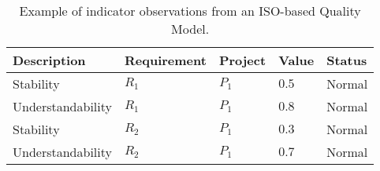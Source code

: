 \begin{table}[!htb]
\renewcommand{\arraystretch}{1.3}
\scriptsize
\begin{center}
\begin{tabular}{|p{2.5cm}|p{3cm}|p{2cm}|p{1cm}|p{1.5cm}|}
\hline
  \textbf{Description} & \textbf{Requirement} & \textbf{Project} & \textbf{Value} & \textbf{Status} \\  \hline
  Stability & $R_1$ & $P_1$ & $0.5$ & Normal \\ \hline
  Understandability & $R_1$ & $P_1$  & $0.8$ & Normal\\ \hline
  Stability & $R_2$ & $P_1$ & $0.3$ & Normal \\ \hline
  Understandability & $R_2$ & $P_1$  & $0.7$ & Normal\\ \hline
  \hline
  \end{tabular}
  \caption{Example of indicator observations from an ISO-based Quality Model.}
  \label{tab:example-wb}
  \end{center}	 
\end{table} 

% 
% 
% 
% 	 	
% 
% 
